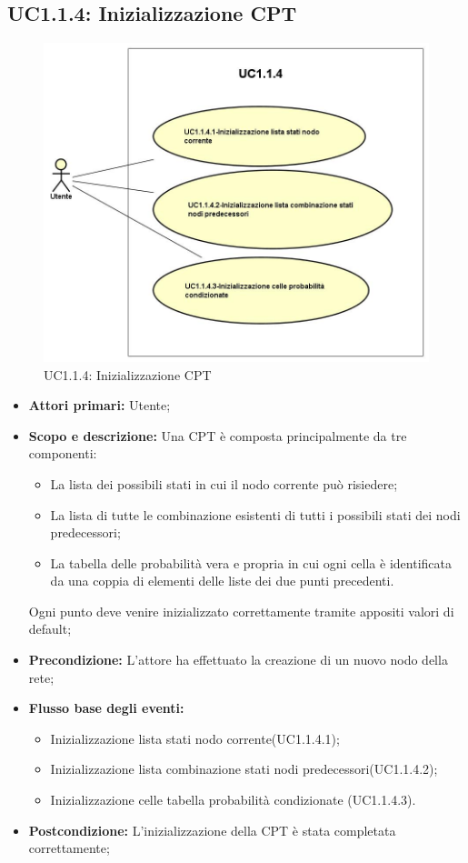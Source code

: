 \subsection{UC1.1.4: Inizializzazione CPT} 
\begin{figure} [H]
	\centering
	\includegraphics[scale=0.45]{Img/UC1-1-4} 
	\caption{UC1.1.4: Inizializzazione CPT} \label{} 
\end{figure} 
\begin{itemize} 
	\item{\textbf{Attori primari:} Utente;} 
	\item{\textbf{Scopo e descrizione:} Una CPT è composta principalmente da tre componenti: 
		\begin{itemize} 
			\item{La lista dei possibili stati in cui il nodo corrente può risiedere;} 
			\item{La lista di tutte le combinazione esistenti di tutti i possibili stati dei nodi predecessori;} 
			\item{La tabella delle probabilità vera e propria in cui ogni cella è identificata da una coppia di elementi delle liste dei due punti precedenti.} 
		\end{itemize} 			
		Ogni punto deve venire inizializzato correttamente tramite appositi valori di default;
	} 
	\item{\textbf{Precondizione:} L'attore ha effettuato la creazione di un nuovo nodo della rete;} 
	\item{\textbf{Flusso base degli eventi:} } 
	\begin{itemize} 
		\item{Inizializzazione lista stati nodo corrente(UC1.1.4.1);} 
		\item{Inizializzazione lista combinazione stati nodi predecessori(UC1.1.4.2);} 
		\item{Inizializzazione celle tabella probabilità condizionate (UC1.1.4.3).} 
	\end{itemize} 
	\item{\textbf{Postcondizione:} L'inizializzazione della CPT è stata completata correttamente;} 
\end{itemize} 

